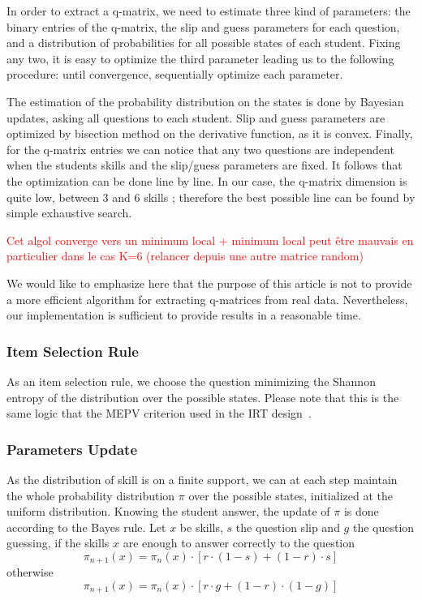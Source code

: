 \documentclass{sig-alternate}
\newcommand\alert[1]{\textcolor{red}{#1}}
\begin{document}
In order to extract a q-matrix, we need to estimate three kind of parameters: the binary entries of the q-matrix, the slip and guess parameters for each question, and a distribution of probabilities for all possible states of each student. Fixing any two, it is easy to optimize the third parameter leading us to the following procedure: until convergence, sequentially optimize each parameter.

The estimation of the probability distribution on the states is done by Bayesian updates, asking all questions to each student. Slip and guess parameters are optimized by bisection method on the derivative function, as it is convex. Finally, for the q-matrix entries we can notice that any two questions are independent when the students skills and the slip/guess parameters are fixed. It follows that the optimization can be done line by line. In our case, the q-matrix dimension is quite low, between 3 and 6 skills ; therefore the best possible line can be found by simple exhaustive search.

\alert{Cet algol converge vers un minimum local + minimum local peut être mauvais en particulier dans le cas K=6 (relancer depuis une autre matrice random)}

We would like to emphasize here that the purpose of this article is not to provide a more efficient algorithm for extracting q-matrices from real data. Nevertheless, our implementation is sufficient to provide results in a reasonable time. %

\subsubsection{Item Selection Rule}

As an item selection rule, we choose the question minimizing the Shannon entropy of the distribution over the possible states. Please note that this is the same logic that the MEPV criterion used in the IRT design~\citep{Cheng2009}.

\subsubsection{Parameters Update}

As the distribution of skill is on a finite support, we can at each step maintain the whole probability distribution $\pi$ over the possible states, initialized at the uniform distribution.
Knowing the student answer, the update of $\pi$ is done according to the Bayes rule. Let $x$ be skills, $s$ the question slip and $g$ the question guessing, if the skills $x$ are enough to answer correctly to the question
\[ \pi_{n+1}(x) = \pi_n(x) \cdot [r\cdot(1-s) + (1-r)\cdot s] \]
otherwise
\[ \pi_{n+1}(x) = \pi_n(x) \cdot [r\cdot g + (1-r)\cdot(1-g)] \]
\end{document}
